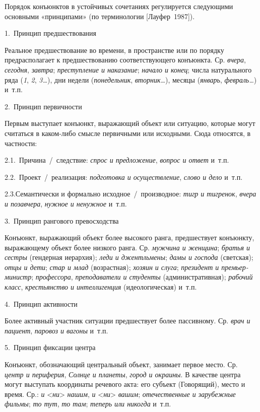 Порядок конъюнктов в устойчивых сочетаниях регулируется следующими
основными «принципами» (по терминологии {[}Лауфер~1987{]}).

1.~Принцип предшествования

Реальное предшествование во времени, в пространстве или по порядку
предрасполагает к предшествованию соответствующего конъюнкта. Ср.
\emph{вчера}, \emph{сегодня}, \emph{завтра}; \emph{преступление и
наказание}; \emph{начало и конец}; числа натурального ряда (\emph{1},
\emph{2}, \emph{3\ldots{}}), дни недели (\emph{понедельник},
\emph{вторник\ldots{}}), месяцы (\emph{январь}, \emph{февраль\ldots{}})
и~т.п.

2.~Принцип первичности

Первым выступает конъюнкт, выражающий объект или ситуацию, которые могут
считаться в каком-либо смысле первичными или исходными. Сюда относятся,
в частности:

2.1.~Причина~/~следствие: \emph{спрос и предложение}, \emph{вопрос и
ответ} и~т.п.

2.2.~Проект~/~реализация: \emph{подготовка и осуществление}, \emph{слово
и дело} и~т.п.

2.3.Семантически и формально исходное~/~производное: \emph{тигр и
тигренок}, \emph{вчера и позавчера}, \emph{нужное и ненужное} и~т.п.

3.~Принцип рангового превосходства

Конъюнкт, выражающий объект более высокого ранга, предшествует
конъюнкту, выражающему объект более низкого ранга. Ср. \emph{мужчина и
женщина}; \emph{братья и сестры} (гендерная иерархия); \emph{леди и
джентльмены}; \emph{дамы и господа} (светская); \emph{отцы и дети};
\emph{стар и млад} (возрастная); \emph{хозяин и слуга}; \emph{президент
и премьер-министр}; \emph{профессора}, \emph{преподаватели и студенты}
(административная); \emph{рабочий класс}, \emph{крестьянство и
интеллигенция} (идеологическая) и~т.п.

4.~Принцип активности

Более активный участник ситуации предшествует более пассивному. Ср.
\emph{врач и пациент}, \emph{паровоз и вагоны} и~т.п.

5.~Принцип фиксации центра

Конъюнкт, обозначающий центральный объект, занимает первое место. Ср.
\emph{центр и периферия}, \emph{Солнце и планеты}, \emph{город и
окраины}. В качестве центра могут выступать координаты речевого акта:
его субъект (Говорящий), место и время. Ср.: \emph{и}
\textless{}\emph{ни}\textgreater{} \emph{нашим}, \emph{и}
\textless{}\emph{ни}\textgreater{} \emph{вашим}; \emph{отечественные и
зарубежные фильмы}; \emph{то тут}, \emph{то там}; \emph{теперь или
никогда} и~т.п.

